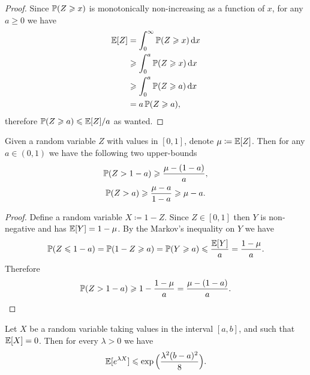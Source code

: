 \begin{proof}
    Since \(\operatorname{\mathbb{P}}(Z \geqslant x)\) is monotonically non-increasing as a function of
    \(x\), for any \(a \geq 0\) we have
    \begin{align*}
        \operatorname{\mathbb{E}}[Z]
         & = \int_0^{\infty} \operatorname{\mathbb{P}}(Z \geqslant x)\, \mathrm{d} x \\
         & \geqslant \int_0^a \operatorname{\mathbb{P}}(Z \geqslant x)\, \mathrm{d} x     \\
         & \geqslant \int_0^a \operatorname{\mathbb{P}}(Z \geqslant a)\, \mathrm{d} x     \\
         & = a \operatorname{\mathbb{P}}(Z \geqslant a),
    \end{align*}
    therefore \(\operatorname{\mathbb{P}}(Z \geqslant a) \leqslant \operatorname{\mathbb{E}}[Z] / a\) as wanted.
\end{proof}

\begin{lemma}
    \label{lem:markov-inequality-lemma}
    Given a random variable \(Z\) with values in \([0, 1]\), denote \(\mu \coloneq
    \operatorname{\mathbb{E}}[Z]\). Then for any \(a \in (0, 1)\) we have the following two upper-bounds
    \begin{gather}
        \operatorname{\mathbb{P}}(Z > 1 - a) \geqslant \frac{\mu - (1 - a)}{a}, \\
        \operatorname{\mathbb{P}}(Z > a) \geqslant \frac{\mu - a}{1 - a} \geqslant \mu - a.
    \end{gather}
\end{lemma}

\begin{proof}
    Define a random variable \(X \coloneq 1 - Z\). Since \(Z \in [0, 1]\) then \(Y\)
    is non-negative and has \(\operatorname{\mathbb{E}}[Y] = 1 - \mu\). By the Markov's inequality on
    \(Y\) we have
    \[
        \operatorname{\mathbb{P}}(Z \leqslant 1 - a)
        = \operatorname{\mathbb{P}}(1 - Z \geqslant a)
        = \operatorname{\mathbb{P}}(Y \geqslant a)
        \leqslant \frac{\operatorname{\mathbb{E}}[Y]}{a}
        = \frac{1 - \mu}{a}.
    \]
    Therefore
    \[
        \operatorname{\mathbb{P}}(Z > 1 - a) \geqslant 1 - \frac{1 - \mu}{a} = \frac{\mu - (1 - a)}{a}.
    \]
\end{proof}

\begin{lemma}
    \label{lem:hoeffding-lemma}
    Let \(X\) be a random variable taking values in the interval \([a, b]\),
    and such that \(\operatorname{\mathbb{E}}[X] = 0\). Then for every \(\lambda > 0\) we have
    \[
        \operatorname{\mathbb{E}}[e^{\lambda X}] \leqslant \exp\Big( \frac{\lambda^2 (b - a)^2}{8} \Big).
    \]
\end{lemma}

